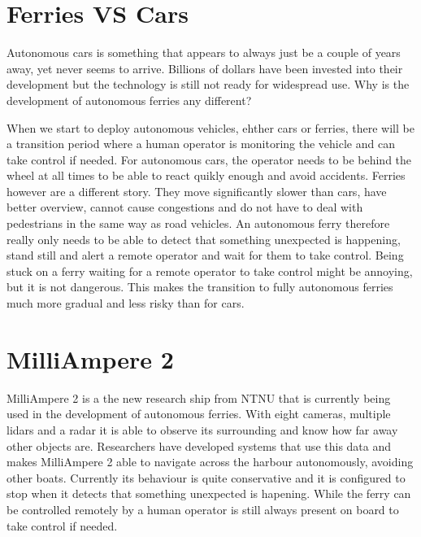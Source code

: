 \documentclass{iopconfser}
\begin{document}
\section*{Ferries VS Cars}
Autonomous cars is something that appears to always just be a couple of years away, yet never seems to arrive.
Billions of dollars have been invested into their development but the technology is still not ready for widespread use. 
Why is the development of autonomous ferries any different?

When we start to deploy autonomous vehicles, ehther cars or ferries, there will be a transition period where a human operator is monitoring the vehicle and can take control if needed. 
For autonomous cars, the operator needs to be behind the wheel at all times to be able to react quikly enough and avoid accidents.
Ferries however are a different story.
They move significantly slower than cars, have better overview, cannot cause congestions and do not have to deal with pedestrians in the same way as road vehicles.
An autonomous ferry therefore really only needs to be able to detect that something unexpected is happening, stand still and alert a remote operator and wait for them to take control.
Being stuck on a ferry waiting for a remote operator to take control might be annoying, but it is not dangerous.
This makes the transition to fully autonomous ferries much more gradual and less risky than for cars.

\section*{MilliAmpere 2}
MilliAmpere 2 is a the new research ship from NTNU that is currently being used in the development of autonomous ferries.
With eight cameras, multiple lidars and a radar it is able to observe its surrounding and know how far away other objects are.
Researchers have developed systems that use this data and makes MilliAmpere 2 able to navigate across the harbour autonomously, avoiding other boats.
Currently its behaviour is quite conservative and it is configured to stop when it detects that something unexpected is hapening.
While the ferry can be controlled remotely by a human operator is still always present on board to take control if needed.







\printbibliography
\end{document}

